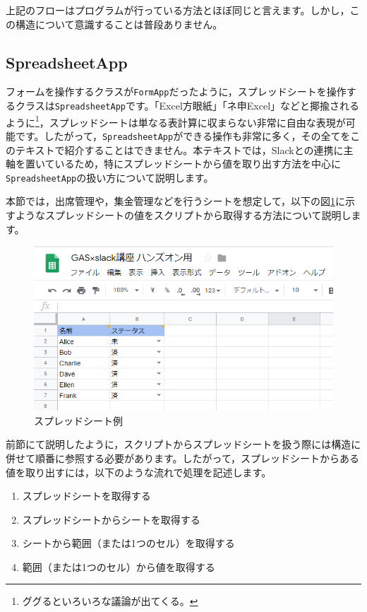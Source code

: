 \documentclass[uplatex,a4j]{jsarticle}
\begin{document}
上記のフローはプログラムが行っている方法とほぼ同じと言えます。しかし，この構造について意識することは普段ありません。


\subsection{SpreadsheetApp}


フォームを操作するクラスが\verb|FormApp|だったように，スプレッドシートを操作するクラスは\verb|SpreadsheetApp|です。「Excel方眼紙」「ネ申Excel」などと揶揄されるように\footnote{ググるといろいろな議論が出てくる。}，スプレッドシートは単なる表計算に収まらない非常に自由な表現が可能です。したがって，\verb|SpreadsheetApp|ができる操作も非常に多く，その全てをこのテキストで紹介することはできません。本テキストでは，Slackとの連携に主軸を置いているため，特にスプレッドシートから値を取り出す方法を中心に\verb|SpreadsheetApp|の扱い方について説明します。

本節では，出席管理や，集金管理などを行うシートを想定して，以下の図\ref{fig:spreadsheet_sample}に示すようなスプレッドシートの値をスクリプトから取得する方法について説明します。

\begin{figure}[H]
 \centering
 \includegraphics[keepaspectratio, scale=0.7]{images/spreadsheet_sample.png}
 \caption{スプレッドシート例}
 \label{fig:spreadsheet_sample}
\end{figure}

前節にて説明したように，スクリプトからスプレッドシートを扱う際には構造に併せて順番に参照する必要があります。したがって，スプレッドシートからある値を取り出すには，以下のような流れで処理を記述します。

\begin{enumerate}
\item スプレッドシートを取得する
\item スプレッドシートからシートを取得する
\item シートから範囲（または1つのセル）を取得する
\item 範囲（または1つのセル）から値を取得する
\end{enumerate}
\end{document}
